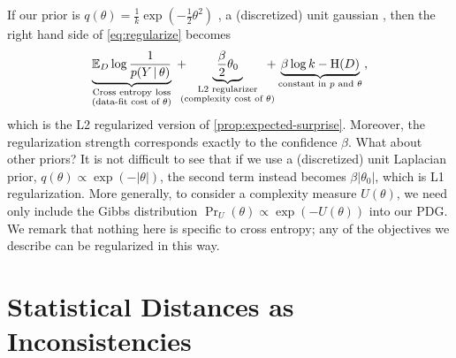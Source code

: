 If our prior is $q(\theta) \!=\! \frac{1}{k} \exp(-\frac12 \theta^2)$%
, a (discretized) unit gaussian%
,
then the right hand side
of \eqref{eq:regularize} becomes
\[ \underbrace{\Ex\nolimits_{D}
	\log \frac{1}{p(Y \,|\, \theta)}
	}
	_{\substack{\text{Cross entropy loss}\\(\text{data-fit cost of $\theta$})}}%
	\; + \!\!\!\!\underbrace{~\frac\beta2 \theta_0~}_{\substack{\text{L2  regularizer}\\(\text{complexity cost of $\theta$})}} \!\!\!\!\!
	{\color{black} +
		\underbrace{\beta \log k - \H(D)}_{\text{constant in $p$ and $\theta$}}}\,, \]
which is the L2 regularized version of \cref{prop:expected-surprise}.
Moreover, the regularization strength corresponds exactly to the confidence $\beta$.
What about other priors? It is not difficult to see that if we use a (discretized) unit Laplacian prior, $q(\theta) \propto \exp(-|\theta|)$, the second term instead becomes $\beta |\theta_0|$, which is L1 regularization.
More generally, to consider a complexity measure $U(\theta)$, we need only include the Gibbs distribution $\Pr_U(\theta) \propto \exp(-U(\theta))$ into our PDG.
We remark that nothing here is specific to cross entropy;
any of the objectives we describe can be regularized in this way.


\section{Statistical Distances as Inconsistencies} \label{sec:statdist}

